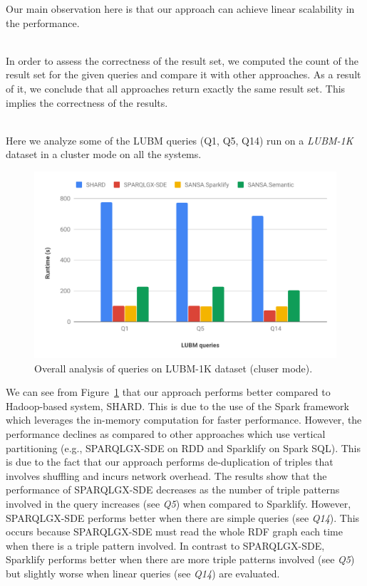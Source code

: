Our main observation here is that our approach can achieve linear scalability in the performance.

~\\ 
In order to assess the correctness of the result set, we computed the count of the result set for the given queries and compare it with other approaches.
As a result of it, we conclude that all approaches return exactly the same result set.
This implies the correctness of the results.

~\\ 
Here we analyze some of the LUBM queries (Q1, Q5, Q14) run on a \textit{LUBM-1K} dataset in a cluster mode on all the systems.

\begin{figure}
   \includegraphics[width=1.0\columnwidth]{images/6_scalable_rdf_querying/semantic-based-overall-analysis.pdf}
    \caption{Overall analysis of queries on LUBM-1K dataset (cluser mode).}
    \label{fig:semantic-based-overall-analysis}
\end{figure}

We can see from Figure~\ref{fig:semantic-based-overall-analysis} that our approach performs better compared to Hadoop-based system, SHARD. 
This is due to the use of the Spark framework which leverages the in-memory computation for faster performance.
However, the performance declines as compared to other approaches which use vertical partitioning (e.g., SPARQLGX-SDE on RDD and Sparklify on Spark SQL).
This is due to the fact that our approach performs de-duplication of triples that involves shuffling and incurs network overhead.
The results show that the performance of SPARQLGX-SDE decreases as the number of triple patterns involved in the query increases (see \textit{Q5}) when compared to Sparklify. 
However, SPARQLGX-SDE performs better when there are simple queries (see \textit{Q14}). 
This occurs because SPARQLGX-SDE must read the whole RDF graph each time when there is a triple pattern involved.
In contrast to SPARQLGX-SDE, Sparklify performs better when there are more triple patterns involved (see \textit{Q5}) but slightly worse when linear queries (see \textit{Q14}) are evaluated. 

